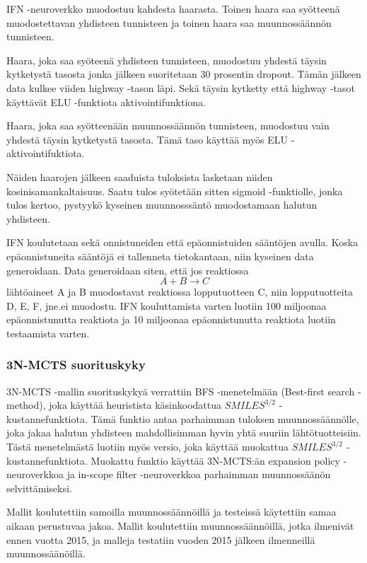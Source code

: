 \documentclass[finnish,twoside,censored,tkt,sw-line]{HYthesisML}
\begin{document}
IFN -neuroverkko muodostuu kahdesta haarasta.
Toinen haara saa syötteenä muodostettavan yhdisteen tunnisteen ja toinen haara saa muunnossäännön tunnisteen.

Haara, joka saa syöteenä yhdisteen tunnisteen, muodostuu yhdestä täysin kytketystä tasosta jonka jälkeen suoritetaan 30 prosentin dropout.
Tämän jälkeen data kulkee viiden highway -tason läpi.
Sekä täysin kytketty että highway -tasot käyttävät ELU -funktiota aktivointifunktiona.

Haara, joka saa syötteenään muunnossäännön tunnisteen, muodostuu vain yhdestä täysin kytketystä tasosta.
Tämä taso käyttää myös ELU -aktivointifuktiota.

Näiden haarojen jälkeen saaduista tuloksista lasketaan niiden kosinisamankaltaisuus.
Saatu tulos syötetään sitten sigmoid -funktiolle, jonka tulos kertoo, pystyykö kyseinen muunnosssäntö muodostamaan halutun yhdisteen.

IFN koulutetaan sekä onnistuneiden että epäonnistuiden sääntöjen avulla.
Koska epäonnistuneita sääntöjä ei tallenneta tietokantaan, niin kyseinen data generoidaan.
Data generoidaan siten, että jos reaktiossa \[A + B \rightarrow C\] lähtöaineet A ja B muodostavat reaktiossa lopputuotteen C, niin lopputuotteita D, E, F, jne.\@ ei muodostu.
IFN kouluttamista varten luotiin 100 miljoonaa epäonnistunutta reaktiota ja 10 miljoonaa epäonnistunutta reaktiota luotiin testaamista varten.

\subsubsection{3N-MCTS suorituskyky}

3N-MCTS -mallin suorituskykyä verrattiin BFS -menetelmään (Best-first search -method), joka käyttää heuristista käsinkoodattua \(SMILES^{3/2}\) -kustannefunktiota.
Tämä funktio antaa parhaimman tuloksen muunnossäännölle, joka jakaa halutun yhdisteen mahdollisimman hyvin yhtä suuriin lähtötuotteisiin.
Tästä menetelmästä luotiin myös versio, joka käyttää muokattua \(SMILES^{3/2}\) -kustannefunktiota.
Muokattu funktio käyttää 3N-MCTS:än expansion policy -neuroverkkoa ja in-scope filter -neuroverkkoa parhaimman muunnossäänön selvittämiseksi.

Mallit koulutettiin samoilla muunnossäännöillä ja testeissä käytettiin samaa aikaan perustuvaa jakoa.
Mallit koulutettiin muunnossäännöillä, jotka ilmenivät ennen vuotta 2015, ja malleja testatiin vuoden 2015 jälkeen ilmenneillä muunnossäänöillä.
\end{document}

